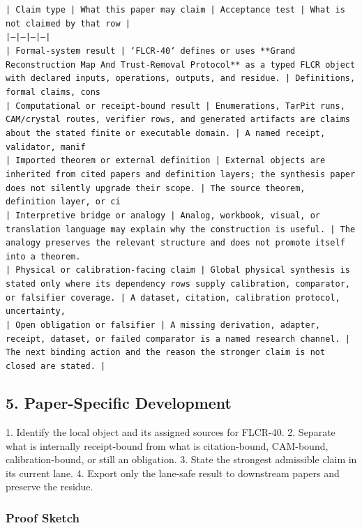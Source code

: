 \documentclass[11pt]{article}
\begin{document}
\noindent\texttt{| Claim type | What this paper may claim | Acceptance test | What is not claimed by that row |}\\
\noindent\texttt{|---|---|---|---|}\\
\noindent\texttt{| Formal-system result | `FLCR-40` defines or uses **Grand Reconstruction Map And Trust-Removal Protocol** as a typed FLCR object with declared inputs, operations, outputs, and residue. | Definitions, formal claims, cons}\\
\noindent\texttt{| Computational or receipt-bound result | Enumerations, TarPit runs, CAM/crystal routes, verifier rows, and generated artifacts are claims about the stated finite or executable domain. | A named receipt, validator, manif}\\
\noindent\texttt{| Imported theorem or external definition | External objects are inherited from cited papers and definition layers; the synthesis paper does not silently upgrade their scope. | The source theorem, definition layer, or ci}\\
\noindent\texttt{| Interpretive bridge or analogy | Analog, workbook, visual, or translation language may explain why the construction is useful. | The analogy preserves the relevant structure and does not promote itself into a theorem. }\\
\noindent\texttt{| Physical or calibration-facing claim | Global physical synthesis is stated only where its dependency rows supply calibration, comparator, or falsifier coverage. | A dataset, citation, calibration protocol, uncertainty,}\\
\noindent\texttt{| Open obligation or falsifier | A missing derivation, adapter, receipt, dataset, or failed comparator is a named research channel. | The next binding action and the reason the stronger claim is not closed are stated. | }\\

\subsection*{5. Paper-Specific Development}

1. Identify the local object and its assigned sources for FLCR-40.
2. Separate what is internally receipt-bound from what is citation-bound, CAM-bound, calibration-bound, or still an obligation.
3. State the strongest admissible claim in its current lane.
4. Export only the lane-safe result to downstream papers and preserve the residue.

\subsubsection*{Proof Sketch}
\end{document}
